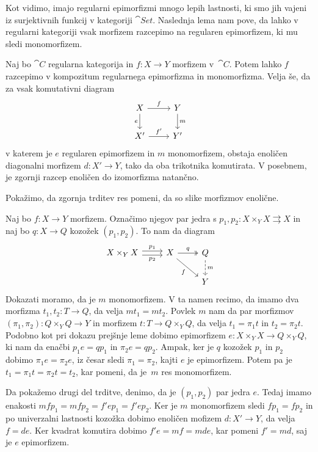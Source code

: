 \documentclass[../kategoricna_logika.tex]{subfiles}
\begin{document}
\noindent
Kot vidimo, imajo regularni epimorfizmi mnogo lepih lastnosti, ki smo jih vajeni iz surjektivnih funkcij v kategoriji $\cat{Set}$.
Naslednja lema nam pove, da lahko v regularni kategoriji vsak morfizem razcepimo na regularen epimorfizem,
ki mu sledi monomorfizem. 
\begin{lema}
  Naj bo $\cat{C}$ regularna kategorija in $f: X \to Y$ morfizem v~$\cat{C}$.
  Potem lahko $f$ razcepimo v kompozitum regularnega epimorfizma in monomorfizma.
  Velja še, da za vsak komutativni diagram
  \begin{equation*}
  \begin{tikzcd}
      X \ar[d, "e"'] \ar[r, "f"] & Y \ar[d, "m"] \\
      X' \ar[r, "f'"] & Y'
  \end{tikzcd}
  \end{equation*}
  v katerem je $e$ regularen epimorfizem in $m$ monomorfizem,
  obstaja enoličen diagonalni morfizem $d : X' \to Y$, tako da oba trikotnika komutirata.
  V posebnem, je zgornji razcep enoličen do izomorfizma natančno.
\end{lema}
\begin{opomba}
  Pokažimo, da zgornja trditev res pomeni, da so slike morfizmov enolične.
\end{opomba}
\begin{dokaz}
Naj bo $f : X \to Y$ morfizem.
Označimo njegov par jedra s $p_1, p_2 : X \times_Y X \rightrightarrows X$
in naj bo $q : X \to Q$ kozožek $(p_1, p_2)$.
To nam da diagram
\begin{equation*}
\begin{tikzcd}
  X \times_Y X \ar[r, shift left, "p_1"] \ar[r, shift right, "p_2"'] & X \ar[dr, "f"'] \ar[r, two heads, "q"] & Q \ar[d, dashed, "m"] \\
  & & Y
\end{tikzcd}
\end{equation*}
Dokazati moramo, da je $m$ monomorfizem. V ta namen recimo, da imamo dva morfizma $t_1, t_2 : T \to Q$,
da velja $m t_1 = m t_2$. Povlek $m$ nam da par morfizmov $(\pi_1, \pi_2) : Q \times_Y Q \to Y$
in morfizem $t : T \to  Q \times_Y Q$, da velja $t_1 = \pi_1 t$ in $t_2 = \pi_2 t$.
Podobno kot pri dokazu prejšnje leme dobimo epimorfizem $e : X \times_Y X \to Q \times_Y Q$,
ki nam da enačbi $p_1 e = q p_1$ in $\pi_2 e = q p_2$.
Ampak, ker je $q$ kozožek $p_1$ in $p_2$ dobimo $\pi_1 e = \pi_2 e$, iz česar sledi $\pi_1 = \pi_2$, 
kajti $e$ je epimorfizem.
Potem pa je $t_1 = \pi_1 t = \pi_2 t = t_2$, kar pomeni, da je~$m$ res monomorfizem.

Da pokažemo drugi del trditve, denimo, da je $(p_1, p_2)$ par jedra $e$.
Tedaj imamo enakosti $m f p_1 = m f p_2 = f' e p_1 = f' e p_2$.
Ker je $m$ monomorfizem sledi $f p_1 = f p_2$ in po univerzalni lastnosti kozožka dobimo enoličen mofizem $d : X' \to Y$,
da velja $f = d e$. Ker kvadrat komutira dobimo $f' e = m f = m d e$, kar pomeni $f' = m d$, saj je $e$ epimorfizem.
\end{dokaz}
\end{document}
